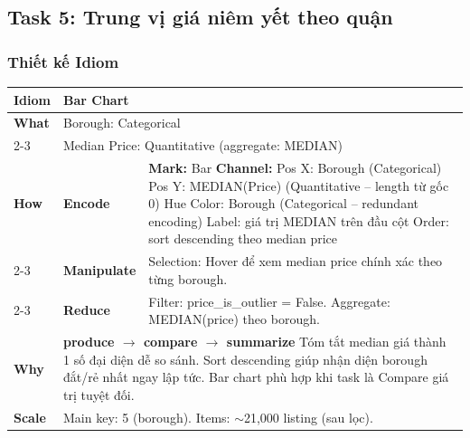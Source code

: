 \subsection{Task 5: Trung vị giá niêm yết theo quận}

\subsubsection{Thiết kế Idiom}

\begin{table}[H]
\centering
\renewcommand{\arraystretch}{1.1}
\begin{tabularx}{\textwidth}{|l|l|X|}
\hline
\textbf{Idiom} & \multicolumn{2}{l|}{\textbf{Bar Chart}} \\ \hline
\textbf{What}
& \multicolumn{2}{X|}{Borough: Categorical} \\ \cline{2-3}
& \multicolumn{2}{X|}{Median Price: Quantitative (aggregate: MEDIAN)} \\ \hline
\textbf{How}
& \textbf{Encode} &
\textbf{Mark:} Bar \newline
\textbf{Channel:} \newline
\hspace*{1em} Pos X: Borough (Categorical) \newline
\hspace*{1em} Pos Y: MEDIAN(Price) (Quantitative -- length từ gốc 0) \newline
\hspace*{1em} Hue Color: Borough (Categorical -- redundant encoding) \newline
\hspace*{1em} Label: giá trị MEDIAN trên đầu cột \newline
\hspace*{1em} Order: sort descending theo median price \\ \cline{2-3}
& \textbf{Manipulate} &
Selection: Hover để xem median price chính xác theo từng borough. \\ \cline{2-3}
& \textbf{Reduce} &
Filter: price\_is\_outlier = False. \newline
Aggregate: MEDIAN(price) theo borough. \\ \hline
\textbf{Why} & \multicolumn{2}{X|}{
\textbf{produce $\rightarrow$ compare $\rightarrow$ summarize} \newline
Tóm tắt median giá thành 1 số đại diện dễ so sánh. Sort descending giúp nhận diện borough đắt/rẻ nhất ngay lập tức. Bar chart phù hợp khi task là Compare giá trị tuyệt đối.
} \\ \hline
\textbf{Scale} & \multicolumn{2}{X|}{
Main key: 5 (borough). \newline
Items: $\sim$21,000 listing (sau lọc).
} \\ \hline
\end{tabularx}
\end{table}

